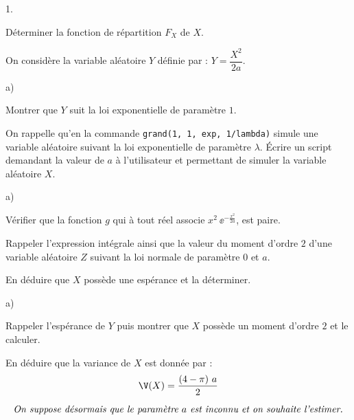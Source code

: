\documentclass[11pt]{article}%
\begin{document}
\begin{noliste}{1.}
  \setcounter{enumi}{1} %
  \setlength{\itemsep}{4mm}
\item Déterminer la fonction de répartition $F_X$ de $X$.

  

\item On considère la variable aléatoire $Y$ définie par : $Y =
  \dfrac{X^2}{2a}$.
  \begin{noliste}{a)}
    \setlength{\itemsep}{2mm}
  \item Montrer que $Y$ suit la loi exponentielle de paramètre $1$.

    
    
  \item On rappelle qu'en \Scilab{} la commande {\tt grand(1, 1,
      \ttq{}exp\ttq{}, 1/lambda)} simule une variable aléatoire
    suivant la loi exponentielle de paramètre $\lambda$. Écrire un
    script \Scilab{} demandant la valeur de $a$ à l'utilisateur et
    permettant de simuler la variable aléatoire $X$.
    
    
  \end{noliste}




\item  
  \begin{noliste}{a)}
    \setlength{\itemsep}{2mm}
  \item Vérifier que la fonction $g$ qui à tout réel associe $x^2 \
    \ee^{- \frac{x^2}{2a}}$, est paire.

    

  \item Rappeler l'expression intégrale ainsi que la valeur du moment
    d'ordre $2$ d'une variable aléatoire $Z$ suivant la loi normale de
    paramètre $0$ et $a$.

    

  \item En déduire que $X$ possède une espérance et la déterminer.

    
  \end{noliste}

\item 
  \begin{noliste}{a)}
    \setlength{\itemsep}{2mm}
  \item Rappeler l'espérance de $Y$ puis montrer que $X$ possède un
    moment d'ordre $2$ et le calculer.

    

  \item En déduire que la variance de $X$ est donnée par :
    \[
    \V(X) = \dfrac{(4 - \pi) \ a}{2}
    \]

    
  \end{noliste}
\end{noliste}
\[
\mbox{\it On suppose désormais que le paramètre $a$ est inconnu et on
  souhaite l'estimer.}
\]
\end{document}
